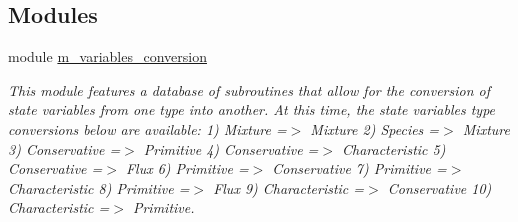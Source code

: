 \subsection*{Modules}
\begin{DoxyCompactItemize}
\item 
module \hyperlink{namespacem__variables__conversion}{m\+\_\+variables\+\_\+conversion}
\begin{DoxyCompactList}\small\item\em This module features a database of subroutines that allow for the conversion of state variables from one type into another. At this time, the state variables type conversions below are available\+: 1) Mixture =$>$ Mixture 2) Species =$>$ Mixture 3) Conservative =$>$ Primitive 4) Conservative =$>$ Characteristic 5) Conservative =$>$ Flux 6) Primitive =$>$ Conservative 7) Primitive =$>$ Characteristic 8) Primitive =$>$ Flux 9) Characteristic =$>$ Conservative 10) Characteristic =$>$ Primitive. \end{DoxyCompactList}\end{DoxyCompactItemize}
